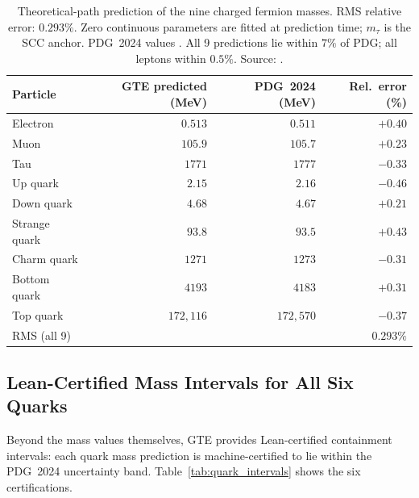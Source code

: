 \documentclass[11pt,openany]{book}
\theoremstyle{remark}
\begin{document}
\begin{table}[htbp]
\centering
\caption{Theoretical-path prediction of the nine charged fermion masses.
RMS relative error: $0.293\%$.  Zero continuous parameters are fitted at
prediction time; $m_\tau$ is the SCC anchor.  PDG~2024 values
\cite{ParticleDataGroup2024}.  All 9 predictions lie within $7\%$ of PDG;
all leptons within $0.5\%$.  Source: \cite{Spivack2025UGP}.}
\label{tab:nine_fermions}
\renewcommand{\arraystretch}{1.08}
\setlength{\tabcolsep}{5.5pt}
\begin{tabular}{@{}lrrr@{}}
\toprule
\textbf{Particle} & \textbf{GTE predicted (MeV)} & \textbf{PDG~2024 (MeV)} & \textbf{Rel.\ error (\%)} \\
\midrule
Electron & $0.513$ & $0.511$ & $+0.40$ \\
Muon     & $105.9$ & $105.7$ & $+0.23$ \\
Tau      & $1771$  & $1777$  & $-0.33$ \\
Up quark & $2.15$  & $2.16$  & $-0.46$ \\
Down quark & $4.68$ & $4.67$ & $+0.21$ \\
Strange quark & $93.8$ & $93.5$ & $+0.43$ \\
Charm quark   & $1271$ & $1273$ & $-0.31$ \\
Bottom quark  & $4193$ & $4183$ & $+0.31$ \\
Top quark     & $172{,}116$ & $172{,}570$ & $-0.37$ \\
\midrule
\multicolumn{3}{l}{RMS (all 9)} & $\mathbf{0.293\%}$ \\
\bottomrule
\end{tabular}
\end{table}

\subsection*{Lean-Certified Mass Intervals for All Six Quarks}

Beyond the mass values themselves, GTE provides Lean-certified containment intervals:
each quark mass prediction is machine-certified to lie within the PDG~2024
uncertainty band.  Table~\ref{tab:quark_intervals} shows the six certifications.
\end{document}
